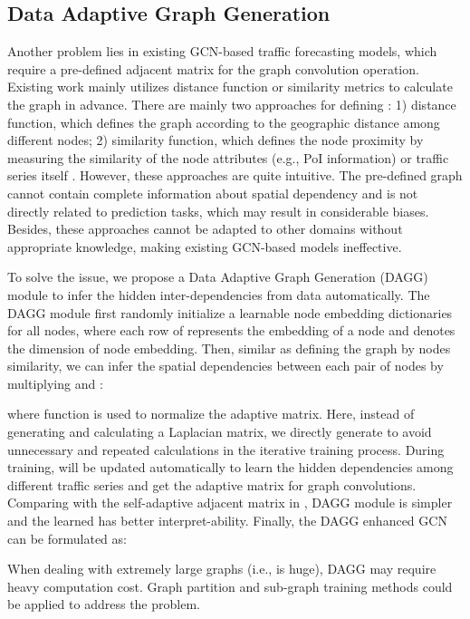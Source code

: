 \documentclass{article}
\begin{document}
\subsection{Data Adaptive Graph Generation}
Another problem lies in existing GCN-based traffic forecasting models, which require a pre-defined adjacent matrix  for the graph convolution operation. 
Existing work mainly utilizes distance function or similarity metrics to calculate the graph in advance.
There are mainly two approaches for defining : 1) distance function, which defines the graph according to the geographic distance among different nodes\cite{DCRNN,stgcn}; 2) similarity function, which defines the node proximity by measuring the similarity of the node attributes (e.g., PoI information) \cite{lei-pakdd2019,multigraph-aaai2019} or traffic series itself \cite{lei-ijcai2019}. However, these approaches are quite intuitive. The pre-defined graph cannot contain complete information about spatial dependency and is not directly related to prediction tasks, which may result in considerable biases. Besides, these approaches cannot be adapted to other domains without appropriate knowledge, making existing GCN-based models ineffective.

To solve the issue, we propose a Data Adaptive Graph Generation (DAGG) module to infer the hidden inter-dependencies from data automatically. 
The DAGG module first randomly initialize a learnable node embedding dictionaries  for all nodes, where each row of  represents the embedding of a node and  denotes the dimension of node embedding. Then, similar as defining the graph by nodes similarity, we can infer the spatial dependencies between each pair of nodes by multiplying  and :


where  function is used to normalize the adaptive matrix.
Here, instead of generating  and calculating a Laplacian matrix, we directly generate  to avoid unnecessary and repeated calculations in the iterative training process. During training,  will be updated automatically to learn the hidden dependencies among different traffic series and get the adaptive matrix for graph convolutions.
Comparing with the self-adaptive adjacent matrix in \cite{graphwavenet}, DAGG module is simpler and the learned  has better interpret-ability.
Finally, the DAGG enhanced GCN can be formulated as:

When dealing with extremely large graphs (i.e.,  is huge), DAGG may require heavy computation cost. Graph partition and sub-graph training methods \cite{gman-aaai2020,mallick2019graph} could be applied to address the problem.
\end{document}
